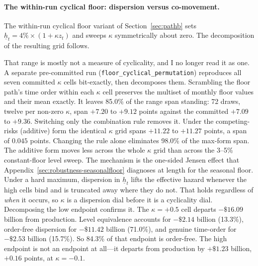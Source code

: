 \documentclass[12pt]{article}
\begin{document}
\paragraph{The within-run cyclical floor: dispersion versus co-movement.}
The within-run cyclical floor variant of Section~\ref{sec:pathb} sets $\underline{h}_t = 4\% \times (1 + \kappa z_t)$ and sweeps $\kappa$ symmetrically about zero. The decomposition of the resulting grid follows.

That range is mostly not a measure of cyclicality, and I no longer read it as one. A separate pre-committed run (\texttt{floor\_cyclical\_permutation}) reproduces all seven committed $\kappa$ cells bit-exactly, then decomposes them. Scrambling the floor path's time order within each $\kappa$ cell preserves the multiset of monthly floor values and their mean exactly. It leaves 85.0\% of the range span standing: 72 draws, twelve per non-zero $\kappa$, span $+7.20$ to $+9.12$ points against the committed $+7.09$ to $+9.36$. Switching only the combination rule removes it. Under the competing-risks (additive) form the identical $\kappa$ grid spans $+11.22$ to $+11.27$ points, a span of $0.045$ points. Changing the rule alone eliminates 98.0\% of the max-form span. The additive form moves less across the whole $\kappa$ grid than across the 3--5\% constant-floor level sweep. The mechanism is the one-sided Jensen effect that Appendix~\ref{sec:robustness-seasonalfloor} diagnoses at length for the seasonal floor. Under a hard maximum, dispersion in $\underline{h}_t$ lifts the effective hazard whenever the high cells bind and is truncated away where they do not. That holds regardless of \emph{when} it occurs, so $\kappa$ is a dispersion dial before it is a cyclicality dial. Decomposing the low endpoint confirms it. The $\kappa = +0.5$ cell departs $-\$16.09$ billion from production. Level equivalence accounts for $-\$2.14$ billion (13.3\%), order-free dispersion for $-\$11.42$ billion (71.0\%), and genuine time-order for $-\$2.53$ billion (15.7\%). So 84.3\% of that endpoint is order-free. The high endpoint is not an endpoint at all---it departs from production by $+\$1.23$ billion, $+0.16$ points, at $\kappa = -0.1$.
\end{document}
